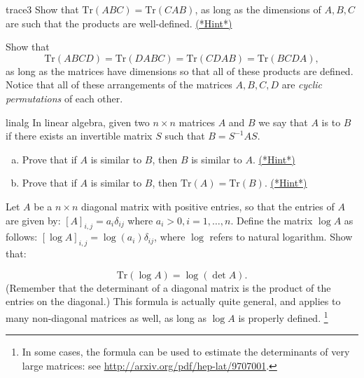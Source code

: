 \begin{exercise}{trace3}
Show that $\text{Tr} ({ABC}) = \text{Tr}({CAB})$, as long as the dimensions of $A, B, C$ are such that the products are well-defined.
\hyperref[sec:sigma:hints]{(*Hint*)} 
\end{exercise}


\begin{exercise}{}
Show that 
\[ \text{Tr} ({ABCD}) = \text{Tr}({DABC})= \text{Tr}({CDAB}) = \text{Tr}({BCDA}),\] 
as long as the matrices have dimensions so that all of these products are defined.  Notice that all of these arrangements of the matrices $A, B, C, D$ are \emph{cyclic permutations} of each other.
\end{exercise}

\begin{exercise}{linalg}
In linear algebra, given two $n \times n$ matrices $A$ and $B$ we say that $A$ is  to $B$ if there exists an invertible matrix $S$ such that $B = S^{-1}AS$. 
\begin{enumerate}[(a)]
\item
Prove that if $A$ is similar to $B$, then $B$ is similar to $A$.
\hyperref[sec:sigma:hints]{(*Hint*)} 
\item
Prove that if $A$ is similar to $B$, then $\text{Tr} ({A}) = \text{Tr} ({B})$. 
\hyperref[sec:sigma:hints]{(*Hint*)} 
\end{enumerate}
\end{exercise}

\begin{exercise}{}
Let $A$ be a $n \times n$ diagonal matrix with positive entries, so that the entries of $A$ are given by:  $ [A]_{i,j} = a_{i} \delta_{ij}$ where $a_i > 0, i = 1, \ldots, n$.  Define the matrix $\log A$ as follows:  $ [\log A]_{i,j} = \log(a_{i}) \delta_{ij}$, where $\log$ refers to natural logarithm.  Show that:

\[ \text{Tr}(\log A) = \log (\det A). \]
(Remember that the determinant of a diagonal matrix is the product of the entries on the diagonal.)
This formula is actually quite general, and applies to many non-diagonal matrices as well, as long as $\log A$ is properly defined. \footnote{In some cases, the formula can be used to estimate the determinants of very large matrices: see \url{http://arxiv.org/pdf/hep-lat/9707001}.} 
\end{exercise}

